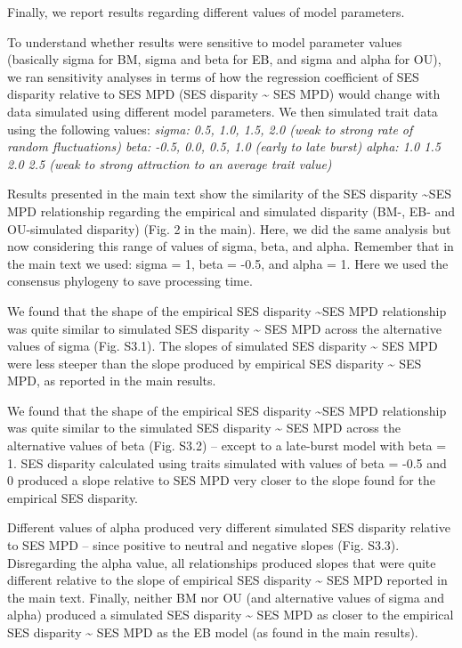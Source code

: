 \documentclass[
]{article}
\begin{document}
Finally, we report results regarding different values of model
parameters.

To understand whether results were sensitive to model parameter values
(basically sigma for BM, sigma and beta for EB, and sigma and alpha for
OU), we ran sensitivity analyses in terms of how the regression
coefficient of SES disparity relative to SES MPD (SES disparity
\textasciitilde{} SES MPD) would change with data simulated using
different model parameters. We then simulated trait data using the
following values: \emph{sigma: 0.5, 1.0, 1.5, 2.0 (weak to strong rate
of random fluctuations) beta: -0.5, 0.0, 0.5, 1.0 (early to late burst)
alpha: 1.0 1.5 2.0 2.5 (weak to strong attraction to an average trait
value)}

Results presented in the main text show the similarity of the SES
disparity \textasciitilde SES MPD relationship regarding the empirical
and simulated disparity (BM-, EB- and OU-simulated disparity) (Fig. 2 in
the main). Here, we did the same analysis but now considering this range
of values of sigma, beta, and alpha. Remember that in the main text we
used: sigma = 1, beta = -0.5, and alpha = 1. Here we used the consensus
phylogeny to save processing time.

We found that the shape of the empirical SES disparity
\textasciitilde SES MPD relationship was quite similar to simulated SES
disparity \textasciitilde{} SES MPD across the alternative values of
sigma (Fig. S3.1). The slopes of simulated SES disparity
\textasciitilde{} SES MPD were less steeper than the slope produced by
empirical SES disparity \textasciitilde{} SES MPD, as reported in the
main results.

We found that the shape of the empirical SES disparity
\textasciitilde SES MPD relationship was quite similar to the simulated
SES disparity \textasciitilde{} SES MPD across the alternative values of
beta (Fig. S3.2) -- except to a late-burst model with beta = 1. SES
disparity calculated using traits simulated with values of beta = -0.5
and 0 produced a slope relative to SES MPD very closer to the slope
found for the empirical SES disparity.

Different values of alpha produced very different simulated SES
disparity relative to SES MPD -- since positive to neutral and negative
slopes (Fig. S3.3). Disregarding the alpha value, all relationships
produced slopes that were quite different relative to the slope of
empirical SES disparity \textasciitilde{} SES MPD reported in the main
text. Finally, neither BM nor OU (and alternative values of sigma and
alpha) produced a simulated SES disparity \textasciitilde{} SES MPD as
closer to the empirical SES disparity \textasciitilde{} SES MPD as the
EB model (as found in the main results).
\end{document}
